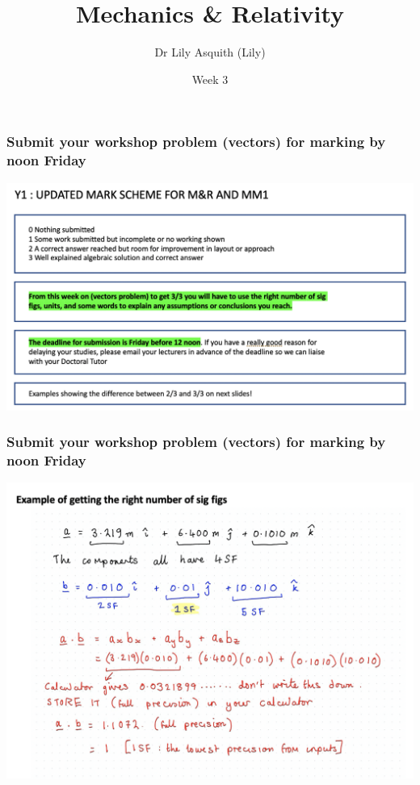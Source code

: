 


% 
\title[ Mechanics \& Relativity]{Mechanics \& Relativity}
\author[Dr Lily Asquith (Lily)]{ Dr Lily Asquith (Lily)}
\date[Week 3]{Week 3}





\begin{frame}
\titlepage
\end{frame} 


\begin{frame}
\frametitle{Submit your workshop problem (vectors) for marking by noon Friday}
\includegraphics[scale=0.34]{markscheme}
\end{frame} 

\begin{frame}
\frametitle{Submit your workshop problem (vectors) for marking by noon Friday}
\includegraphics[scale=0.34]{sigfigs}
\end{frame} 

